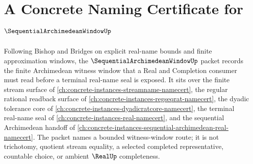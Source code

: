 \chapter{A Concrete Naming Certificate for $\SequentialArchimedeanWindowUp$}
\label{ch:concrete-instances-sequential-archimedean-window-namecert}

Following Bishop and Bridges on explicit real-name bounds and finite approximation windows, the $\SequentialArchimedeanWindowUp$ packet records the finite Archimedean witness window that a Real and Completion consumer must read before a terminal real-name seal is exposed. It sits over the finite stream surface of \autoref{ch:concrete-instances-streamname-namecert}, the regular rational readback surface of \autoref{ch:concrete-instances-regseqrat-namecert}, the dyadic tolerance core of \autoref{ch:concrete-instances-dyadicratcore-namecert}, the terminal real-name seal of \autoref{ch:concrete-instances-real-namecert}, and the sequential Archimedean handoff of \autoref{ch:concrete-instances-sequential-archimedean-real-namecert}. The packet names a bounded witness-window route; it is not trichotomy, quotient stream equality, a selected completed representative, countable choice, or ambient $\RealUp$ completeness.

